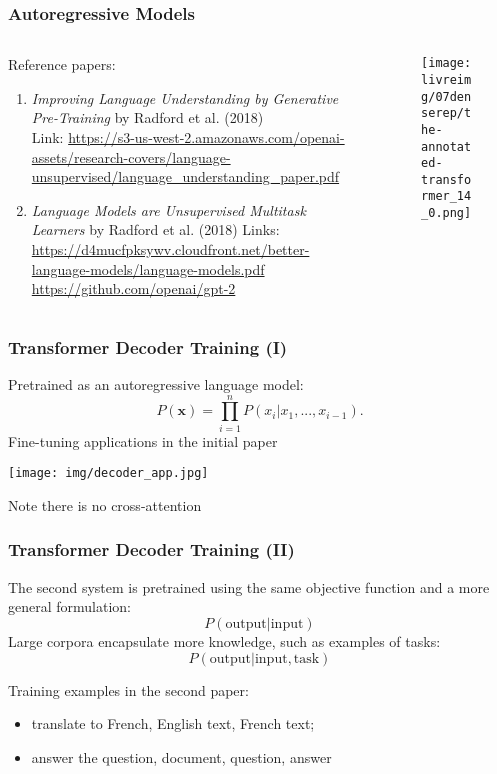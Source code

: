 \begin{frame}[fragile]
\frametitle{Autoregressive Models}\color{structure}
\begin{columns}
\begin{column}[c]{0.62\textwidth}
 Reference papers:
\begin{enumerate}\color{structure}
\item \textit{Improving Language Understanding by Generative Pre-Training} by Radford et al. (2018)\\
Link: \url{https://s3-us-west-2.amazonaws.com/openai-assets/research-covers/language-unsupervised/language_understanding_paper.pdf}
\item \textit{Language Models are Unsupervised Multitask Learners} by Radford et al. (2018) Links: \url{https://d4mucfpksywv.cloudfront.net/better-language-models/language-models.pdf}
\url{https://github.com/openai/gpt-2}
\end{enumerate}
\end{column}
\begin{column}[c]{0.4\textwidth}
\begin{figure}[tb]
\begin{center}
 \texttt{[image: \\livreimg/07denserep/the-annotated-transformer\_14\_0.png]}
\end{center}
\end{figure}
\end{column}
\end{columns}
\end{frame}

\begin{frame}[fragile]
\frametitle{Transformer Decoder Training (I)}\color{structure}
Pretrained as an autoregressive language model:
\[
P(\mathbf{x}) = \prod_{i=1}^{n}P(x_i|x_1, ..., x_{i-1}).
\]
Fine-tuning applications in the initial paper
\begin{center}
 \texttt{[image: img/decoder\_app.jpg]}
\end{center}
Note there is no cross-attention
\end{frame}

\begin{frame}[fragile]
\frametitle{Transformer Decoder Training (II)}\color{structure}
The second system is pretrained using the same objective function and a more general formulation:
\[
P(\text{output}|\text{input})
\]
Large corpora encapsulate more knowledge, such as examples of tasks:
\[
P(\text{output}|\text{input}, \text{task})
\]

Training examples in the second paper:
\begin{itemize}\color{structure}
\item translate to French, English text, French text;
\item answer the question, document, question, answer
\end{itemize}
\end{frame}

